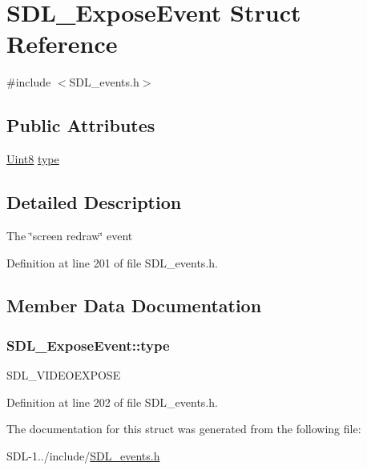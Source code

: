 \hypertarget{struct_s_d_l___expose_event}{}\section{S\+D\+L\+\_\+\+Expose\+Event Struct Reference}
\label{struct_s_d_l___expose_event}


{\ttfamily \#include $<$S\+D\+L\+\_\+events.\+h$>$}

\subsection*{Public Attributes}
\begin{DoxyCompactItemize}
\item 
\hyperlink{_s_d_l__stdinc_8h_a2944638813a090aa23e62f4da842c3e2}{Uint8} \hyperlink{struct_s_d_l___expose_event_a3d6e2c14e4492130733e055b6db0c8c8}{type}
\end{DoxyCompactItemize}


\subsection{Detailed Description}
The \char`\"{}screen redraw\char`\"{} event 

Definition at line 201 of file S\+D\+L\+\_\+events.\+h.



\subsection{Member Data Documentation}
\hypertarget{struct_s_d_l___expose_event_a3d6e2c14e4492130733e055b6db0c8c8}{}
\subsubsection[{type}]{ S\+D\+L\+\_\+\+Expose\+Event\+::type}\label{struct_s_d_l___expose_event_a3d6e2c14e4492130733e055b6db0c8c8}
S\+D\+L\+\_\+\+V\+I\+D\+E\+O\+E\+X\+P\+O\+S\+E 

Definition at line 202 of file S\+D\+L\+\_\+events.\+h.



The documentation for this struct was generated from the following file\+:\begin{DoxyCompactItemize}
\item 
S\+D\+L-\/1../include/\hyperlink{_s_d_l__events_8h}{S\+D\+L\+\_\+events.\+h}\end{DoxyCompactItemize}
